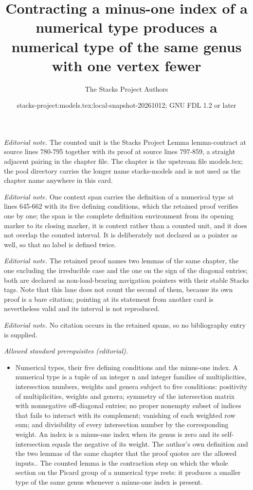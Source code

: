 \documentclass[10pt,a4paper]{amsart}
\title{Contracting a minus-one index of a numerical type produces a numerical type of the same genus with one vertex fewer}
\author{The Stacks Project Authors}
\date{stacks-project:models.tex:local-snapshot-20261012; GNU FDL 1.2 or later}
\theoremstyle{plain}
\theoremstyle{definition}
\theoremstyle{remark}
\numberwithin{equation}{subsection}
\begin{document}
\maketitle
\noindent\textit{Editorial note.} The counted unit is the Stacks Project Lemma lemma-contract at source lines 780-795 together with its proof at source lines 797-859, a straight adjacent pairing in the chapter file. The chapter is the upstream file models.tex; the pool directory carries the longer name stacks-models and is not used as the chapter name anywhere in this card.\par\medskip
\noindent\textit{Editorial note.} One context span carries the definition of a numerical type at lines 645-662 with its five defining conditions, which the retained proof verifies one by one; the span is the complete definition environment from its opening marker to its closing marker, it is context rather than a counted unit, and it does not overlap the counted interval. It is deliberately not declared as a pointer as well, so that no label is defined twice.\par\medskip
\noindent\textit{Editorial note.} The retained proof names two lemmas of the same chapter, the one excluding the irreducible case and the one on the sign of the diagonal entries; both are declared as non-load-bearing navigation pointers with their stable Stacks tags. Note that this lane does not count the second of them, because its own proof is a bare citation; pointing at its statement from another card is nevertheless valid and its interval is not reproduced.\par\medskip
\noindent\textit{Editorial note.} No citation occurs in the retained spans, so no bibliography entry is supplied.\par\medskip
\noindent\textit{Allowed standard prerequisites (editorial).}\begin{itemize}
\item Numerical types, their five defining conditions and the minus-one index. A numerical type is a tuple of an integer n and integer families of multiplicities, intersection numbers, weights and genera subject to five conditions: positivity of multiplicities, weights and genera; symmetry of the intersection matrix with nonnegative off-diagonal entries; no proper nonempty subset of indices that fails to interact with its complement; vanishing of each weighted row sum; and divisibility of every intersection number by the corresponding weight. An index is a minus-one index when its genus is zero and its self-intersection equals the negative of its weight. The author's own definition and the two lemmas of the same chapter that the proof quotes are the allowed inputs.. The counted lemma is the contraction step on which the whole section on the Picard group of a numerical type rests: it produces a smaller type of the same genus whenever a minus-one index is present.
\end{itemize}\medskip
\end{document}
